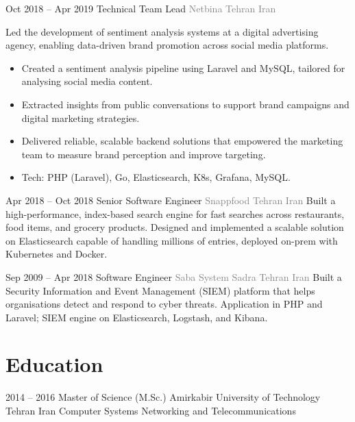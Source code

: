 \documentclass[14pt, a4paper, sans]{moderncv}
\begin{document}
    \cventry
    {Oct 2018 -- Apr 2019}
    {Technical Team Lead}
    {\newline \textcolor{gray}{Netbina}}
    {\textcolor{gray}{Tehran}}
    {\textcolor{gray}{Iran}}
    {
        \fontsize{13}{16}\selectfont
        Led the development of sentiment analysis systems at a digital advertising agency, enabling data-driven brand promotion across social media platforms.
        \begin{itemize}
            \item Created a sentiment analysis pipeline using Laravel and MySQL, tailored for analysing social media content.
            \item Extracted insights from public conversations to support brand campaigns and digital marketing strategies.
            \item Delivered reliable, scalable backend solutions that empowered the marketing team to measure brand perception and improve targeting.
            \item Tech: PHP (Laravel), Go, Elasticsearch, K8s, Grafana, MySQL.
        \end{itemize}
    }

    \cventry
    {Apr 2018 -- Oct 2018}
    {Senior Software Engineer}
    {\newline \textcolor{gray}{Snappfood}}
    {\textcolor{gray}{Tehran}}
    {\textcolor{gray}{Iran}}
    {
        \fontsize{13}{16}\selectfont
        Built a high-performance, index-based search engine for fast searches across restaurants, food items, and grocery products. Designed and implemented a scalable solution on Elasticsearch capable of handling millions of entries, deployed on-prem with Kubernetes and Docker.
    }

    \cventry
    {Sep 2009 -- Apr 2018}
    {Software Engineer}
    {\newline \textcolor{gray}{Saba System Sadra}}
    {\textcolor{gray}{Tehran}}
    {\textcolor{gray}{Iran}}
    {
        \fontsize{13}{16}\selectfont
        Built a Security Information and Event Management (SIEM) platform that helps organisations detect and respond to cyber threats. Application in PHP and Laravel; SIEM engine on Elasticsearch, Logstash, and Kibana.
    }


    \section{Education}\label{sec:education}

    \cventry
    {2014 -- 2016}
    {Master of Science (M.Sc.)}
    {Amirkabir University of Technology}
    {Tehran}
    {Iran}
    {Computer Systems Networking and Telecommunications}
\end{document}
